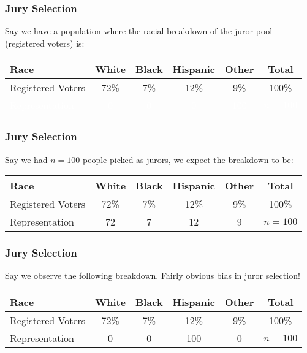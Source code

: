 \documentclass[handout]{beamer}
\newcommand{\blue}[1]{\textcolor{blue2}{#1}}
\begin{document}
\begin{frame}[fragile]
\frametitle{Jury Selection}
Say we have a population where the racial breakdown of the juror pool (registered voters) is:


\begin{center}
\begin{tabular}{l||cccc|c}
Race & White & Black & Hispanic & Other & Total \\ 
\hline
Registered Voters & 72\% & 7\% & 12\% & 9\% & 100\%\\ 
\textcolor{white}{Representation} & \textcolor{white}{0} & \textcolor{white}{0} & \textcolor{white}{0} & \textcolor{white}{100} & \textcolor{white}{$n=100$} \\ 
\end{tabular}
\end{center}


\end{frame}


\begin{frame}[fragile]
\frametitle{Jury Selection}
Say we had $n=100$ people picked as jurors, we \blue{expect} the breakdown to be:

\begin{center}
\begin{tabular}{l||cccc|c}
Race & White & Black & Hispanic & Other & Total \\ 
\hline
Registered Voters & 72\% & 7\% & 12\% & 9\% & 100\%\\ 
Representation & 72 & 7 & 12 & 9 & $n=100$ \\ 
\end{tabular}
\end{center}

\end{frame}


\begin{frame}[fragile]
\frametitle{Jury Selection}
Say we \blue{observe} the following breakdown.  Fairly obvious bias in juror selection!

\begin{center}
\begin{tabular}{l||cccc|c}
Race & White & Black & Hispanic & Other & Total \\ 
\hline
Registered Voters & 72\% & 7\% & 12\% & 9\% & 100\%\\ 
Representation & 0 & 0 & 100 & 0 & $n=100$ \\ 
\end{tabular}
\end{center}

\end{frame}
\end{document}
